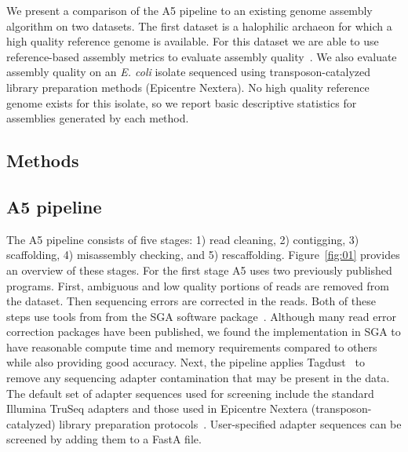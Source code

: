 \documentclass{bioinfo}
\begin{document}
We present a comparison of the A5 pipeline to an existing genome assembly algorithm on two datasets. The first dataset
is a halophilic archaeon for which a high quality reference genome is available. For this dataset we are able to use
reference-based assembly metrics to evaluate assembly quality~\citep{Darling2011}. We also evaluate assembly quality on an 
\textit{E. coli} isolate sequenced using transposon-catalyzed library preparation methods (Epicentre Nextera). 
No high quality reference genome exists for this isolate, so we report basic descriptive statistics for assemblies
generated by each method.  

\begin{methods}
\section{Methods}

\subsection{A5 pipeline}

The A5 pipeline consists of five stages: 1) read cleaning, 2) contigging, 3) scaffolding,
4) misassembly checking, and 5) rescaffolding. Figure~\ref{fig:01} provides an overview of these stages. 
For the first stage A5 uses two previously
published programs. First, ambiguous and low quality portions of reads are removed from the dataset. Then sequencing errors are corrected in the reads.
Both of these steps use tools from 
from the SGA software package~\citep{Simpson2010}.  Although many read error correction packages have been published,
we found the implementation in SGA to have reasonable compute time and memory requirements compared to others while also providing 
good accuracy.  Next, the pipeline applies Tagdust~\citep{Lassmann2009} to remove any 
sequencing adapter contamination that may be present in the data. The default set of adapter sequences used for screening
include the standard Illumina TruSeq adapters and those used in Epicentre Nextera (transposon-catalyzed) library preparation protocols~\citep{Adey2010}. 
User-specified adapter sequences can be screened by adding them to a FastA file. 


\end{methods}
\end{document}
